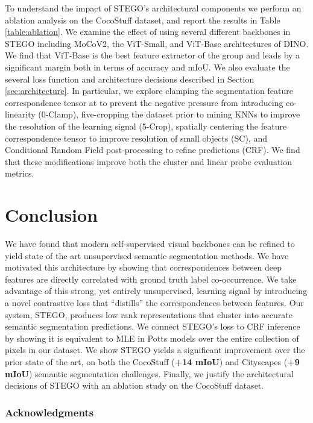 \documentclass{article} \usepackage{iclr2022_conference,times}
\begin{document}
To understand the impact of STEGO's architectural components we perform an ablation analysis on the CocoStuff dataset, and report the results in Table \ref{table:ablation}. We examine the effect of using several different backbones in STEGO including MoCoV2, the ViT-Small, and ViT-Base architectures of DINO. We find that ViT-Base is the best feature extractor of the group and leads by a significant margin both in terms of accuracy and mIoU. We also evaluate the several loss function and architecture decisions described in Section \ref{sec:architecture}. In particular, we explore clamping the segmentation feature correspondence tensor at  to prevent the negative pressure from introducing co-linearity (0-Clamp), five-cropping the dataset prior to mining KNNs to improve the resolution of the learning signal (5-Crop), spatially centering the feature correspondence tensor to improve resolution of small objects (SC), and Conditional Random Field post-processing to refine predictions (CRF). We find that these modifications improve both the cluster and linear probe evaluation metrics. 

\vspace{-.1in}
\section{Conclusion}
\vspace{-.1in}

We have found that modern self-supervised visual backbones can be refined to yield state of the art unsupervised semantic segmentation methods. We have motivated this architecture by showing that correspondences between deep features are directly correlated with ground truth label co-occurrence. We take advantage of this strong, yet entirely unsupervised, learning signal by introducing a novel contrastive loss that ``distills'' the correspondences between features. Our system, STEGO, produces low rank representations that cluster into accurate semantic segmentation predictions. We connect STEGO's loss to CRF inference by showing it is equivalent to MLE in Potts models over the entire collection of pixels in our dataset. We show STEGO yields a significant improvement over the prior state of the art, on both the CocoStuff (\textbf{+14 mIoU}) and Cityscapes (\textbf{+9 mIoU}) semantic segmentation challenges. Finally, we justify the architectural decisions of STEGO with an ablation study on the CocoStuff dataset. 


\subsubsection*{Acknowledgments}
\end{document}
